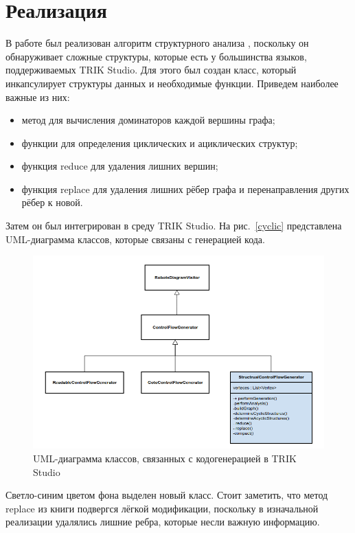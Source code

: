 \documentclass[14pt]{matmex-diploma}
\begin{document}
\section{Реализация}
В работе был реализован алгоритм структурного анализа \cite{muchnick1997advanced},
поскольку он обнаруживает сложные структуры, которые есть у большинства языков,
поддерживаемых TRIK Studio.
Для этого был создан класс, который инкапсулирует структуры данных и необходимые
функции. Приведем наиболее важные из них:
\begin{itemize}
    \item метод для вычисления доминаторов каждой вершины графа;
    \item функции для определения циклических и ациклических структур;
    \item функция reduce для удаления лишних вершин;
    \item функция replace для удаления лишних рёбер графа и перенаправления
          других рёбер к новой.
\end{itemize}

Затем он был интегрирован в среду TRIK Studio. На рис.~\ref{cyclic} представлена 
UML-диаграмма классов, которые связаны с генерацией кода.

\begin{figure}[H]
\centering
\includegraphics[scale=0.6]{images/uml3.png}
\caption{UML-диаграмма классов, связанных с кодогенерацией в TRIK Studio}
\end{figure}

Светло-синим цветом фона выделен новый класс.
Стоит заметить, что метод replace из книги \cite{muchnick1997advanced}
подвергся лёгкой модификации, поскольку в изначальной
реализации удалялись лишние ребра, которые несли важную информацию.
\end{document}
